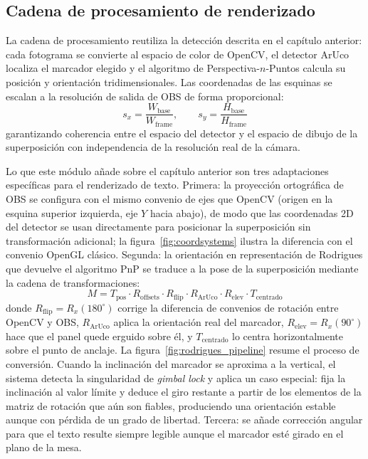  
\subsection{Cadena de procesamiento de renderizado}
\label{subsec:pipeline_overlay}
 
La cadena de procesamiento reutiliza la detección descrita en el capítulo anterior: cada fotograma se convierte al
espacio de color de OpenCV, el detector ArUco localiza el marcador elegido y el algoritmo de
Perspectiva-$n$-Puntos calcula su posición y orientación tridimensionales. Las coordenadas de
las esquinas se escalan a la resolución de salida de OBS de forma proporcional:
\[
  s_x = \frac{W_{\text{base}}}{W_{\text{frame}}}, \qquad s_y = \frac{H_{\text{base}}}{H_{\text{frame}}}
\]
garantizando coherencia entre el espacio del detector y el espacio de dibujo de la superposición
con independencia de la resolución real de la cámara.

Lo que este módulo añade sobre el capítulo anterior son tres adaptaciones específicas para el
renderizado de texto. Primera: la proyección ortográfica de OBS se configura con el mismo
convenio de ejes que OpenCV (origen en la esquina superior izquierda, eje $Y$ hacia abajo),
de modo que las coordenadas 2D del detector se usan directamente para posicionar la superposición sin
transformación adicional; la figura~\ref{fig:coordsystems} ilustra la diferencia con el
convenio OpenGL clásico. Segunda: la orientación en representación de Rodrigues que devuelve el
algoritmo PnP se traduce a la pose de la superposición mediante la cadena de transformaciones:
\[
  M = T_{\text{pos}} \cdot R_{\text{offsets}} \cdot R_{\text{flip}} \cdot R_{\text{ArUco}}
  \cdot R_{\text{elev}} \cdot T_{\text{centrado}}
\]
donde $R_{\text{flip}} = R_x(180^\circ)$ corrige la diferencia de convenios de rotación entre
OpenCV y OBS, $R_{\text{ArUco}}$ aplica la orientación real del marcador, $R_{\text{elev}} =
R_x(90^\circ)$ hace que el panel quede erguido sobre él, y $T_{\text{centrado}}$ lo centra
horizontalmente sobre el punto de anclaje. La figura~\ref{fig:rodrigues_pipeline} resume el
proceso de conversión. Cuando la inclinación del marcador se aproxima a la vertical, el sistema
detecta la singularidad de \textit{gimbal lock} y aplica un caso especial: fija la inclinación
al valor límite y deduce el giro restante a partir de los elementos de la matriz de rotación que
aún son fiables, produciendo una orientación estable aunque con pérdida de un grado de libertad.
Tercera: se añade corrección angular para que el texto resulte siempre legible aunque el
marcador esté girado en el plano de la mesa.
 
